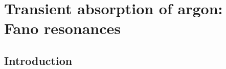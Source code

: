 \chapter{Transient absorption of argon: Fano resonances}
\label{ar_fano_exp}

\section{Introduction}
\label{intro_ar_fano}

\lipsum